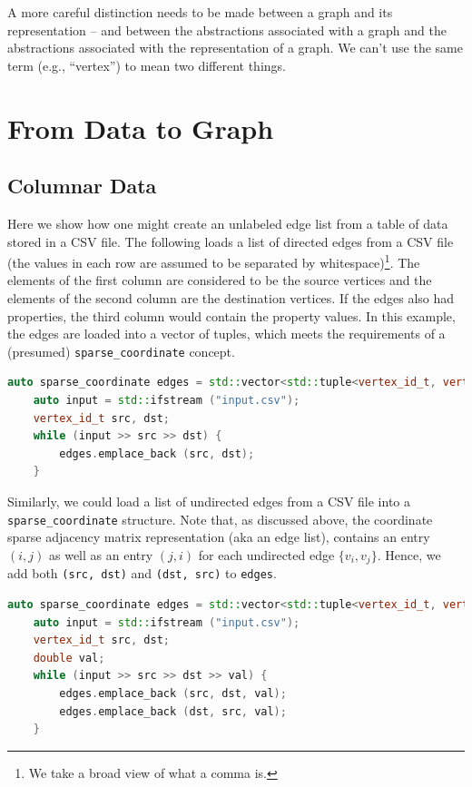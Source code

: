 A more careful distinction needs to be made between a graph and its representation -- and between the abstractions associated with
a graph and the abstractions associated with the representation of a graph.  We can't use the same term (e.g., ``vertex'') to mean
two different things.


\section{From Data to Graph}

\subsection{Columnar Data}
Here we show how one might create an unlabeled edge list from a table of data stored in a CSV file.  The following loads a list of directed edges from a CSV file (the values in each row are assumed to be separated by whitespace)\footnote{We take a broad view of what a comma is.}.
The elements of the first column are considered to be the source vertices and the elements of
the second column are the destination vertices. If the edges also had properties, the third column
would contain the property values.  In this example, the edges are loaded into a vector of tuples, which meets the requirements of a (presumed) \lstinline{sparse_coordinate} concept.
\begin{lstlisting}[language=C++]
    auto sparse_coordinate edges = std::vector<std::tuple<vertex_id_t, vertex_id_t>;
    auto input = std::ifstream ("input.csv");
    vertex_id_t src, dst;
    while (input >> src >> dst) {
        edges.emplace_back (src, dst);
    }
\end{lstlisting}

Similarly, we could load a list of undirected edges from a CSV file into a 
\lstinline{sparse_coordinate} structure.  
Note that, as discussed above, the coordinate sparse adjacency matrix representation (aka an edge list), contains an entry $(i, j)$ as well as an entry $(j, i)$ for each undirected edge $\{ v_i, v_j \}$.  Hence, we add both \lstinline{(src, dst)} and  \lstinline{(dst, src)} to \lstinline{edges}.
\begin{lstlisting}[language=C++]
    auto sparse_coordinate edges = std::vector<std::tuple<vertex_id_t, vertex_id_t, double> edges;
    auto input = std::ifstream ("input.csv");
    vertex_id_t src, dst;
    double val;
    while (input >> src >> dst >> val) {
        edges.emplace_back (src, dst, val);
        edges.emplace_back (dst, src, val);
    }
\end{lstlisting}

